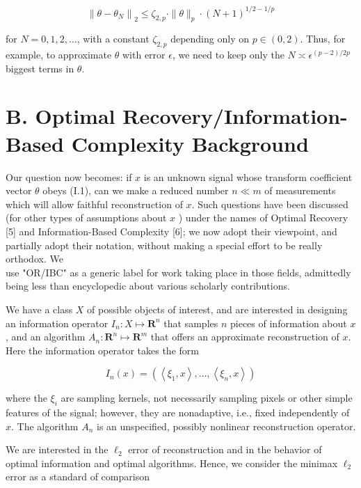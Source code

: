 \documentclass[10pt]{article}
\begin{document}
\begin{equation*}
\left\|\theta-\theta_{N}\right\|_{2} \leq \zeta_{2, p} \cdot\|\theta\|_{p} \cdot(N+1)^{1 / 2-1 / p} \tag{I.2}
\end{equation*}


for $N=0,1,2, \ldots$, with a constant $\zeta_{2, p}$ depending only on $p \in(0,2)$. Thus, for example, to approximate $\theta$ with error $\epsilon$, we need to keep only the $N \asymp \epsilon^{(p-2) / 2 p}$ biggest terms in $\theta$.

\section*{B. Optimal Recovery/Information-Based Complexity Background}
Our question now becomes: if $x$ is an unknown signal whose transform coefficient vector $\theta$ obeys (I.1), can we make a reduced number $n \ll m$ of measurements which will allow faithful reconstruction of $x$. Such questions have been discussed (for other types of assumptions about $x$ ) under the names of Optimal Recovery [5] and Information-Based Complexity [6]; we now adopt their viewpoint, and partially adopt their notation, without making a special effort to be really orthodox. We\\
use "OR/IBC" as a generic label for work taking place in those fields, admittedly being less than encyclopedic about various scholarly contributions.

We have a class $X$ of possible objects of interest, and are interested in designing an information operator $I_{n}: X \mapsto \boldsymbol{R}^{n}$ that samples $n$ pieces of information about $x$, and an algorithm $A_{n}: \boldsymbol{R}^{n} \mapsto \boldsymbol{R}^{m}$ that offers an approximate reconstruction of $x$. Here the information operator takes the form

$$
I_{n}(x)=\left(\left\langle\xi_{1}, x\right\rangle, \ldots,\left\langle\xi_{n}, x\right\rangle\right)
$$

where the $\xi_{i}$ are sampling kernels, not necessarily sampling pixels or other simple features of the signal; however, they are nonadaptive, i.e., fixed independently of $x$. The algorithm $A_{n}$ is an unspecified, possibly nonlinear reconstruction operator.

We are interested in the $\ell_{2}$ error of reconstruction and in the behavior of optimal information and optimal algorithms. Hence, we consider the minimax $\ell_{2}$ error as a standard of comparison
\end{document}
